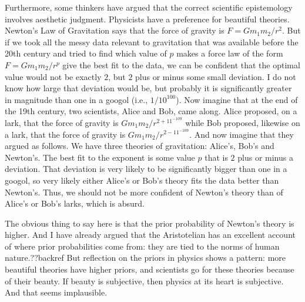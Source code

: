 Furthermore, some thinkers have argued that the correct scientific epistemology involves aesthetic judgment. 
Physicists have a preference for beautiful theories. Newton's Law of Gravitation says that the force of gravity
is $F=Gm_1m_2/r^2$. But if we took all the messy data relevant to gravitation that was available before the 20th century
and tried to find which value of $p$ makes a force law of the form $F=Gm_1m_2/r^p$ give the best fit to the data,
we can be confident that the optimal value would not be exactly $2$, but $2$ plus or minus some small deviation.
I do not know how large that deviation would be, but probably it is significantly greater in magnitude than one 
in a googol (i.e., $1/10^{100}$). Now imagine that at the end of the 19th century, two scientists, Alice and Bob, 
came along. Alice proposed, on a lark, that the force of gravity is $Gm_1m_2/r^{2+11^{-109}}$ while Bob proposed,
likewise on a lark, that the force 
of gravity is $Gm_1m_2/r^{2-11^{-109}}$. And now imagine that they argued as follows. We have three theories of
gravitation: Alice's, Bob's and Newton's. The best fit to the exponent is some value $p$ that is $2$ plus or minus
a deviation. That deviation is very likely to be significantly bigger than one in a googol, so very likely either
Alice's or Bob's theory fits the data better than Newton's. Thus, we should not be more confident of Newton's
theory than of Alice's or Bob's larks, which is absurd.

The obvious thing to say here is that the prior probability of Newton's theory is higher. And I have already
argued that the Aristotelian has an excellent account of where prior probabilities come from: they are tied
to the norms of human nature.??backref But reflection on the priors in physics shows a pattern: more
beautiful theories have higher priors, and scientists go for these theories because of their beauty. If
beauty is subjective, then physics at its heart is subjective. And that seems implausible. 

